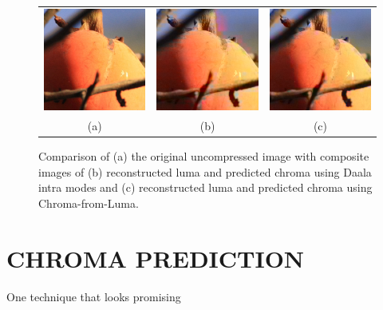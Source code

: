 \documentclass[a4paper]{spie}  %
\begin{document}
\begin{figure}
\begin{center}
\begin{tabular}{c c c}
\includegraphics[natwidth=200,natheight=200,width=1.75in]{fruits-orig.png}
&
\includegraphics[natwidth=200,natheight=200,width=1.75in]{fruits-intra.png}
&
\includegraphics[natwidth=200,natheight=200,width=1.75in]{fruits-cfl.png}
\\
(a) & (b) & (c)
\end{tabular}
\end{center}
\caption[example]{\label{fig:comp} Comparison of (a) the original uncompressed
 image with composite images of (b) reconstructed luma and predicted chroma
 using Daala intra modes and (c) reconstructed luma and predicted chroma using
 Chroma-from-Luma.}
\end{figure}

\section{CHROMA PREDICTION}
\label{sec:chroma}

One technique that looks promising 
\end{document}
